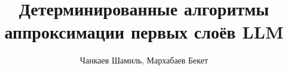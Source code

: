 \documentclass[12pt,a4paper]{article}
\title{Детерминированные алгоритмы аппроксимации первых слоёв LLM}
\author{Чанкаев Шамиль, Мархабаев Бекет}
\date{}
\begin{document}
\maketitle

\begin{abstract}

\end{abstract}




\end{document}
